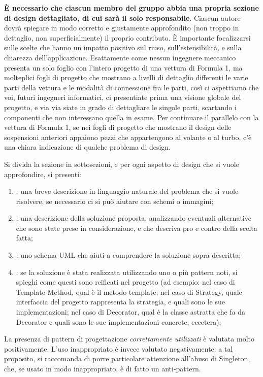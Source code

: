 \documentclass[a4paper,12pt]{report}
\begin{document}
\begin{itemize}
\textbf{È necessario che ciascun membro del gruppo abbia una propria sezione di design dettagliato,
di cui sarà il solo responsabile}.
%
Ciascun autore dovrà spiegare in modo corretto e giustamente approfondito (non troppo in dettaglio, non superficialmente) il proprio contributo.
%
È importante focalizzarsi sulle scelte che hanno un impatto positivo sul riuso, sull'estensibilità, e sulla chiarezza dell'applicazione.
%
Esattamente come nessun ingegnere meccanico presenta un solo foglio con l'intero progetto di una vettura di Formula 1, ma molteplici fogli di progetto che mostrano a livelli di dettaglio differenti le varie parti della vettura e le modalità di connessione fra le parti, così ci aspettiamo che voi, futuri ingegneri informatici, ci presentiate prima una visione globale del progetto, e via via siate in grado di dettagliare le singole parti, scartando i componenti che non interessano quella in esame.
%
Per continuare il parallelo con la vettura di Formula 1, se nei fogli di progetto che mostrano il
design delle sospensioni anteriori appaiono pezzi che appartengono al volante o al turbo, c'è una
chiara indicazione di qualche problema di design.

Si divida la sezione in sottosezioni, e per ogni aspetto di design che si vuole approfondire, si presenti:
\begin{enumerate}
    \item: una breve descrizione in linguaggio naturale del problema che si vuole risolvere, se necessario ci si può aiutare con schemi o immagini;
    \item: una descrizione della soluzione proposta, analizzando eventuali alternative che sono state prese in considerazione, e che descriva pro e contro della scelta fatta;
    \item: uno schema UML che aiuti a comprendere la soluzione sopra descritta;
    \item: se la soluzione è stata realizzata utilizzando uno o più pattern noti, si spieghi come questi sono reificati nel progetto
    (ad esempio: nel caso di Template Method, qual è il metodo template;
    nel caso di Strategy, quale interfaccia del progetto rappresenta la strategia, e quali sono le sue implementazioni;
    nel caso di Decorator, qual è la classe astratta che fa da Decorator e quali sono le sue implementazioni concrete; eccetera);
\end{enumerate}
%
La presenza di pattern di progettazione \emph{correttamente utilizzati} è valutata molto positivamente.
%
L'uso inappropriato è invece valutato negativamente: a tal proposito, si raccomanda di porre particolare attenzione all'abuso di Singleton, che, se usato in modo inappropriato, è di fatto un anti-pattern.


\end{itemize}
\end{document}
